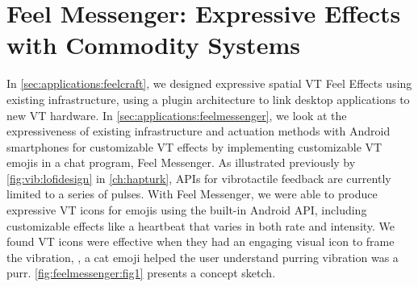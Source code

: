 \section{Feel Messenger: Expressive Effects with Commodity Systems}
\label{sec:applications:feelmessenger}
\noindent
In \autoref{sec:applications:feelcraft}, we designed expressive spatial VT Feel Effects using existing infrastructure, using a plugin architecture to link desktop applications to new VT hardware.
In \autoref{sec:applications:feelmessenger}, we look at the expressiveness of existing infrastructure and actuation methods with Android smartphones for customizable VT effects by implementing customizable VT emojis in a chat program, Feel Messenger.
As illustrated previously by \autoref{fig:vib:lofidesign} in \autoref{ch:hapturk}, APIs for vibrotactile feedback are currently limited to a series of pulses.
With Feel Messenger, we were able to produce expressive VT icons for emojis using the built-in Android API, including customizable effects like a heartbeat that varies in both rate and intensity.
We found VT icons were effective when they had an engaging visual icon to frame the vibration, \eg, a cat emoji helped the user understand purring vibration was a purr.
\autoref{fig:feelmessenger:fig1} presents a concept sketch.

